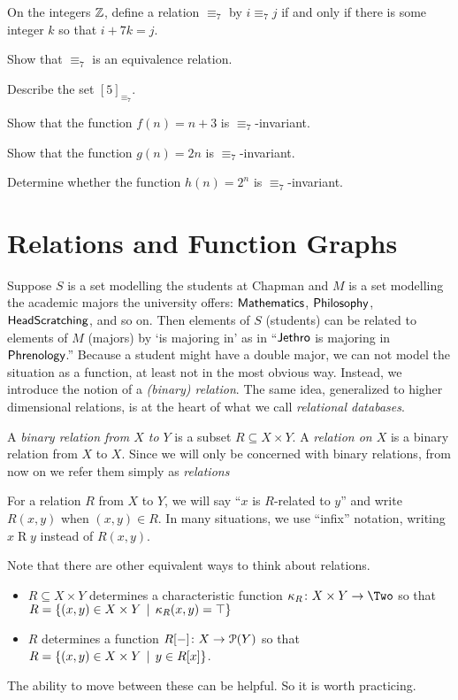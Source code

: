 \begin{exercises}
	On the integers $\mathbb Z$, define a relation $\equiv_7$ by $i \equiv_7 j$ if and only if there is some integer $k$ so that $i +7k = j$.
	\begin{nextexercise}
		\item Show that $\equiv_7$ is an equivalence relation.
		\item Describe the set $[5]_{\equiv_7}$.
		\item Show that the function $f(n) = n+3$ is $\equiv_7$-invariant.
		\item Show that the function $g(n) = 2n$ is $\equiv_7$-invariant.
		\item Determine whether the function $h(n) = 2^n$ is $\equiv_7$-invariant.
	\end{nextexercise}
\end{exercises}

\section{Relations and Function Graphs}

Suppose $S$ is a set modelling the students at Chapman and $M$ is a set modelling the academic majors the university offers: ${\mathord{\textsf{Mathematics}}}$, ${\mathord{\textsf{Philosophy}}}$, ${\mathord{\textsf{HeadScratching}}}$, and so on. Then elements of $S$ (students) can be related to elements of $M$ (majors) by `is majoring in' as in
``${\mathord{\textsf{Jethro}}}$ is majoring in ${\mathord{\textsf{Phrenology}}}$.'' 
Because a student might have a double major, we can not model the situation as a function, at least not in the most obvious way. 
Instead, we introduce the notion of a \emph{(binary) relation}. 
The same idea, generalized to higher dimensional relations, is at the heart of what we call \emph{relational databases}. 

\begin{defn}
	A \emph{binary relation from $X$ to $Y$} is a subset $R\subseteq X\times Y$.
	A \emph{relation on $X$} is a binary relation from $X$ to $X$. 
	Since we will only be concerned with binary relations, from now on we refer them simply as \emph{relations}
	
	For a relation $R$ from $X$ to $Y$, we will say ``$x$ is $R$-related to $y$'' and write $R(x,y)$ when $(x,y)\in R$. 
	In many situations, we use ``infix'' notation, writing $x\mathrel{R}y$ instead of $R(x,y)$.
\end{defn}

Note that there are other equivalent ways to think about relations. 
\begin{itemize}
	\item $R\subseteq X\times Y$ determines a characteristic function $\fromto {\kappa_R}{X\times Y}\Two$ so that $R = \{(x,y)\in X\times Y\,\mid\, \kappa_R(x,y)=\top\}$
	\item $R$ determines a function ${R[-]}\colon{X}\to{{\mathcal{P}}(Y)}$ so that $R = \{(x,y)\in X\times Y\,\mid\, y\in R[x]\}$.
\end{itemize}
The ability to move between these can be helpful.
So it is worth practicing.

